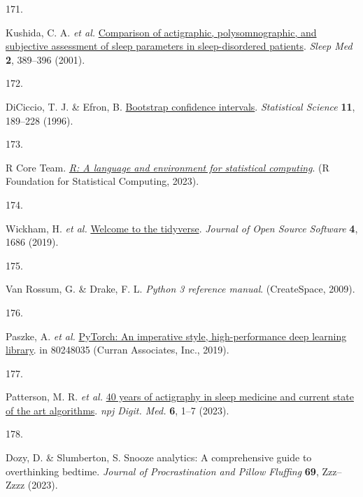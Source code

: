 \documentclass[
  10pt,
]{scrbook}
\newlength{\cslhangindent}
\newlength{\csllabelwidth}
\newlength{\cslentryspacingunit} %
\newenvironment{CSLReferences}[2] %
 {%
  \setlength{\parindent}{0pt}
  \ifodd #1
  \let\oldpar\par
  \def\par{\hangindent=\cslhangindent\oldpar}
  \fi
  \setlength{\parskip}{#2\cslentryspacingunit}
 }%
 {}
\newcommand{\CSLLeftMargin}[1]{\parbox[t]{\csllabelwidth}{#1}}
\newcommand{\CSLRightInline}[1]{\parbox[t]{\linewidth - \csllabelwidth}{#1}\break}
\let\originaltextbf\textbf
\renewcommand{\textbf}[1]{\textcolor{color1}{\textsf{\originaltextbf{#1}}}}
\begin{document}
\begin{CSLReferences}{0}{0}
\leavevmode{}%
\CSLLeftMargin{171. }%
\CSLRightInline{Kushida, C. A. \emph{et al.}
\href{https://doi.org/10.1016/s1389-9457(00)00098-8}{Comparison of
actigraphic, polysomnographic, and subjective assessment of sleep
parameters in sleep-disordered patients}. \emph{Sleep Med} \textbf{2},
389--396 (2001).}

\leavevmode{}%
\CSLLeftMargin{172. }%
\CSLRightInline{DiCiccio, T. J. \& Efron, B.
\href{https://doi.org/10.1214/ss/1032280214}{Bootstrap confidence
intervals}. \emph{Statistical Science} \textbf{11}, 189--228 (1996).}

\leavevmode{}%
\CSLLeftMargin{173. }%
\CSLRightInline{R Core Team. \emph{\href{https://www.R-project.org/}{R:
A language and environment for statistical computing}}. (R Foundation
for Statistical Computing, 2023).}

\leavevmode{}%
\CSLLeftMargin{174. }%
\CSLRightInline{Wickham, H. \emph{et al.}
\href{https://doi.org/10.21105/joss.01686}{Welcome to the tidyverse}.
\emph{Journal of Open Source Software} \textbf{4}, 1686 (2019).}

\leavevmode{}%
\CSLLeftMargin{175. }%
\CSLRightInline{Van Rossum, G. \& Drake, F. L. \emph{Python 3 reference
manual}. (CreateSpace, 2009).}

\leavevmode{}%
\CSLLeftMargin{176. }%
\CSLRightInline{Paszke, A. \emph{et al.}
\href{http://papers.neurips.cc/paper/9015-pytorch-an-imperative-style-high-performance-deep-learning-library.pdf}{PyTorch:
An imperative style, high-performance deep learning library}. in
80248035 (Curran Associates, Inc., 2019).}

\leavevmode{}%
\CSLLeftMargin{177. }%
\CSLRightInline{Patterson, M. R. \emph{et al.}
\href{https://doi.org/10.1038/s41746-023-00802-1}{40 years of actigraphy
in sleep medicine and current state of the art algorithms}. \emph{npj
Digit. Med.} \textbf{6}, 1--7 (2023).}

\leavevmode{}%
\CSLLeftMargin{178. }%
\CSLRightInline{Dozy, D. \& Slumberton, S. Snooze analytics: A
comprehensive guide to overthinking bedtime. \emph{Journal of
Procrastination and Pillow Fluffing} \textbf{69}, Zzz--Zzzz (2023).}


\end{CSLReferences}
\end{document}
